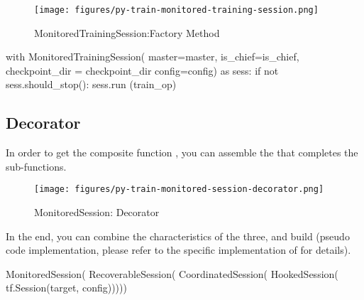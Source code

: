 \begin{content}
\begin{figure}[!htbp]
  \centering
  \texttt{[image: figures/py-train-monitored-training-session.png]}
  \caption{MonitoredTrainingSession:Factory Method}
  \label{fig:py-train-monitored-training-session}
\end{figure}

\begin{leftbar}
\begin{python}
with MonitoredTrainingSession(
  master=master,
  is_chief=is_chief,
  checkpoint_dir = checkpoint_dir
  config=config) as sess:
  if not sess.should_stop():
    sess.run (train_op)
\end{python}
\end{leftbar}


\subsection{Decorator}
In order to get the composite function , you can assemble the  that completes the sub-functions.

\begin{enum}
\end{enum}

\begin{figure}[!htbp]
  \centering
  \texttt{[image: figures/py-train-monitored-session-decorator.png]}
  \caption{MonitoredSession: Decorator}
  \label{fig:py-train-monitored-session-decorator}
\end{figure}

In the end, you can combine the characteristics of the three, and build  (pseudo code implementation, please refer to the specific implementation of  for details).

\begin{leftbar}
\begin{python}
MonitoredSession(
  RecoverableSession(
    CoordinatedSession(
      HookedSession(
        tf.Session(target, config)))))
\end{python}
\end{leftbar}

\end{content}


